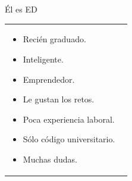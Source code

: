 \begin{frame}{Él es ED}
  \begin{tabular}{l l}
    \parbox{0.5\textwidth}{
      \begin{itemize}
        \item Recién graduado.
        \item Inteligente.
        \item Emprendedor.
        \item Le gustan los retos.
        \item Poca experiencia laboral.
        \item Sólo código universitario.
        \item Muchas dudas.
      \end{itemize}
    } &
     \\
  \end{tabular}
\end{frame}

